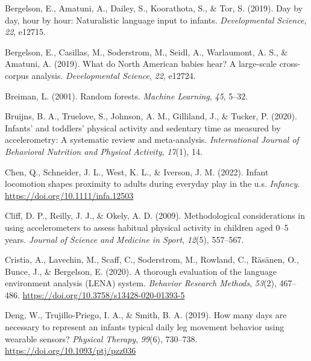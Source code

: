 \documentclass[
  man]{apa6}
\newlength{\cslhangindent}
\newlength{\cslentryspacingunit} %
\newenvironment{CSLReferences}[2] %
 {%
  \setlength{\parindent}{0pt}
  \ifodd #1
  \let\oldpar\par
  \def\par{\hangindent=\cslhangindent\oldpar}
  \fi
  \setlength{\parskip}{#2\cslentryspacingunit}
 }%
 {}
\begin{document}
\begin{CSLReferences}{1}{0}
\leavevmode{}%
Bergelson, E., Amatuni, A., Dailey, S., Koorathota, S., \& Tor, S. (2019). Day by day, hour by hour: Naturalistic language input to infants. \emph{Developmental Science}, \emph{22}, e12715.

\leavevmode{}%
Bergelson, E., Casillas, M., Soderstrom, M., Seidl, A., Warlaumont, A. S., \& Amatuni, A. (2019). What do {N}orth {A}merican babies hear? {A} large-scale cross-corpus analysis. \emph{Developmental Science}, \emph{22}, e12724.

\leavevmode{}%
Breiman, L. (2001). Random forests. \emph{Machine Learning}, \emph{45}, 5--32.

\leavevmode{}%
Bruijns, B. A., Truelove, S., Johnson, A. M., Gilliland, J., \& Tucker, P. (2020). Infants' and toddlers' physical activity and sedentary time as measured by accelerometry: A systematic review and meta-analysis. \emph{International Journal of Behavioral Nutrition and Physical Activity}, \emph{17}(1), 14.

\leavevmode{}%
Chen, Q., Schneider, J. L., West, K. L., \& Iverson, J. M. (2022). Infant locomotion shapes proximity to adults during everyday play in the u.s. \emph{Infancy}. \url{https://doi.org/10.1111/infa.12503}

\leavevmode{}%
Cliff, D. P., Reilly, J. J., \& Okely, A. D. (2009). Methodological considerations in using accelerometers to assess habitual physical activity in children aged 0--5 years. \emph{Journal of Science and Medicine in Sport}, \emph{12}(5), 557--567.

\leavevmode{}%
Cristia, A., Lavechin, M., Scaff, C., Soderstrom, M., Rowland, C., Räsänen, O., Bunce, J., \& Bergelson, E. (2020). A thorough evaluation of the language environment analysis ({LENA}) system. \emph{Behavior Research Methods}, \emph{53}(2), 467--486. \url{https://doi.org/10.3758/s13428-020-01393-5}

\leavevmode{}%
Deng, W., Trujillo-Priego, I. A., \& Smith, B. A. (2019). How many days are necessary to represent an infant{\textquotesingle}s typical daily leg movement behavior using wearable sensors? \emph{Physical Therapy}, \emph{99}(6), 730--738. \url{https://doi.org/10.1093/ptj/pzz036}


\end{CSLReferences}
\end{document}
